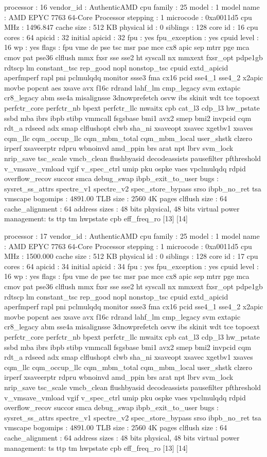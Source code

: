 processor	: 16
vendor_id	: AuthenticAMD
cpu family	: 25
model		: 1
model name	: AMD EPYC 7763 64-Core Processor
stepping	: 1
microcode	: 0xa0011d5
cpu MHz		: 1496.847
cache size	: 512 KB
physical id	: 0
siblings	: 128
core id		: 16
cpu cores	: 64
apicid		: 32
initial apicid	: 32
fpu		: yes
fpu_exception	: yes
cpuid level	: 16
wp		: yes
flags		: fpu vme de pse tsc msr pae mce cx8 apic sep mtrr pge mca cmov pat pse36 clflush mmx fxsr sse sse2 ht syscall nx mmxext fxsr_opt pdpe1gb rdtscp lm constant_tsc rep_good nopl nonstop_tsc cpuid extd_apicid aperfmperf rapl pni pclmulqdq monitor ssse3 fma cx16 pcid sse4_1 sse4_2 x2apic movbe popcnt aes xsave avx f16c rdrand lahf_lm cmp_legacy svm extapic cr8_legacy abm sse4a misalignsse 3dnowprefetch osvw ibs skinit wdt tce topoext perfctr_core perfctr_nb bpext perfctr_llc mwaitx cpb cat_l3 cdp_l3 hw_pstate ssbd mba ibrs ibpb stibp vmmcall fsgsbase bmi1 avx2 smep bmi2 invpcid cqm rdt_a rdseed adx smap clflushopt clwb sha_ni xsaveopt xsavec xgetbv1 xsaves cqm_llc cqm_occup_llc cqm_mbm_total cqm_mbm_local user_shstk clzero irperf xsaveerptr rdpru wbnoinvd amd_ppin brs arat npt lbrv svm_lock nrip_save tsc_scale vmcb_clean flushbyasid decodeassists pausefilter pfthreshold v_vmsave_vmload vgif v_spec_ctrl umip pku ospke vaes vpclmulqdq rdpid overflow_recov succor smca debug_swap ibpb_exit_to_user
bugs		: sysret_ss_attrs spectre_v1 spectre_v2 spec_store_bypass srso ibpb_no_ret tsa vmscape
bogomips	: 4891.00
TLB size	: 2560 4K pages
clflush size	: 64
cache_alignment	: 64
address sizes	: 48 bits physical, 48 bits virtual
power management: ts ttp tm hwpstate cpb eff_freq_ro [13] [14]

processor	: 17
vendor_id	: AuthenticAMD
cpu family	: 25
model		: 1
model name	: AMD EPYC 7763 64-Core Processor
stepping	: 1
microcode	: 0xa0011d5
cpu MHz		: 1500.000
cache size	: 512 KB
physical id	: 0
siblings	: 128
core id		: 17
cpu cores	: 64
apicid		: 34
initial apicid	: 34
fpu		: yes
fpu_exception	: yes
cpuid level	: 16
wp		: yes
flags		: fpu vme de pse tsc msr pae mce cx8 apic sep mtrr pge mca cmov pat pse36 clflush mmx fxsr sse sse2 ht syscall nx mmxext fxsr_opt pdpe1gb rdtscp lm constant_tsc rep_good nopl nonstop_tsc cpuid extd_apicid aperfmperf rapl pni pclmulqdq monitor ssse3 fma cx16 pcid sse4_1 sse4_2 x2apic movbe popcnt aes xsave avx f16c rdrand lahf_lm cmp_legacy svm extapic cr8_legacy abm sse4a misalignsse 3dnowprefetch osvw ibs skinit wdt tce topoext perfctr_core perfctr_nb bpext perfctr_llc mwaitx cpb cat_l3 cdp_l3 hw_pstate ssbd mba ibrs ibpb stibp vmmcall fsgsbase bmi1 avx2 smep bmi2 invpcid cqm rdt_a rdseed adx smap clflushopt clwb sha_ni xsaveopt xsavec xgetbv1 xsaves cqm_llc cqm_occup_llc cqm_mbm_total cqm_mbm_local user_shstk clzero irperf xsaveerptr rdpru wbnoinvd amd_ppin brs arat npt lbrv svm_lock nrip_save tsc_scale vmcb_clean flushbyasid decodeassists pausefilter pfthreshold v_vmsave_vmload vgif v_spec_ctrl umip pku ospke vaes vpclmulqdq rdpid overflow_recov succor smca debug_swap ibpb_exit_to_user
bugs		: sysret_ss_attrs spectre_v1 spectre_v2 spec_store_bypass srso ibpb_no_ret tsa vmscape
bogomips	: 4891.00
TLB size	: 2560 4K pages
clflush size	: 64
cache_alignment	: 64
address sizes	: 48 bits physical, 48 bits virtual
power management: ts ttp tm hwpstate cpb eff_freq_ro [13] [14]

